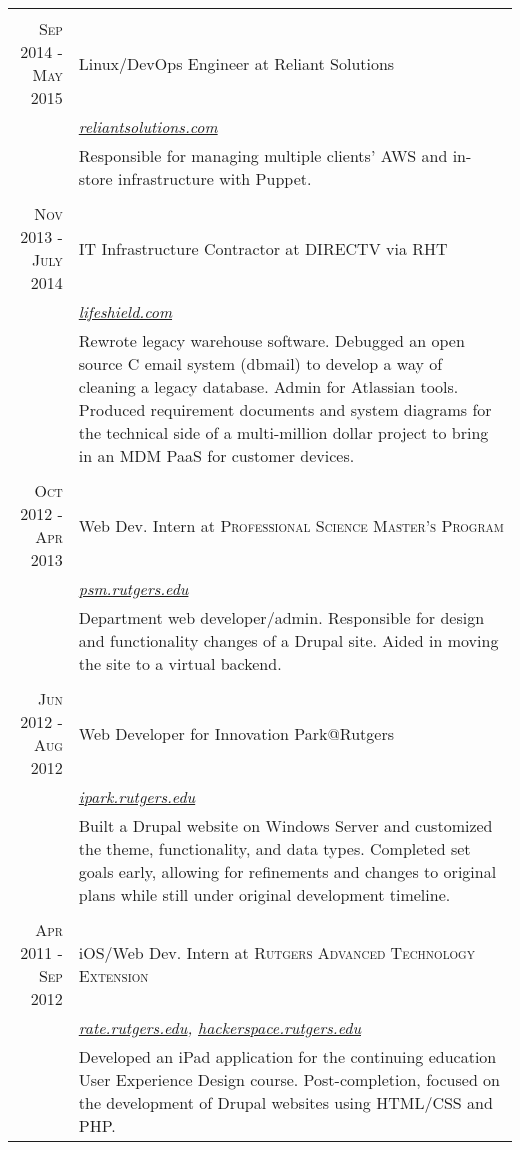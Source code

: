 \documentclass[a4paper, 10pt, onepage]{article} %
\begin{document}
\begin{tabular}{r|p{10cm}}
\multicolumn{2}{c}{}\\
\textsc{Sep 2014 - May 2015} & {Linux/DevOps Engineer at Reliant Solutions}\\
&\small\emph{\href{https://reliantsolutions.com}{reliantsolutions.com}}\\
&\footnotesize{Responsible for managing multiple clients' AWS and in-store infrastructure with Puppet.}\\

\multicolumn{2}{c}{}\\
\textsc{Nov 2013 - July 2014} & {IT Infrastructure Contractor at DIRECTV via RHT}\\
&\small\emph{\href{https://lifeshield.com}{lifeshield.com}}\\
&\footnotesize{Rewrote legacy warehouse software. Debugged an open source C email system (dbmail) to develop a way of cleaning a legacy database. Admin for Atlassian tools. Produced requirement documents and system diagrams for the technical side of a multi-million dollar project to bring in an MDM PaaS for customer devices.}\\

\multicolumn{2}{c}{}\\
\textsc{Oct 2012 - Apr 2013} & Web Dev. Intern at \textsc{Professional Science Master's Program}\\
& \small\emph{\href{https://psm.rutgers.edu}{psm.rutgers.edu}}\\
& \footnotesize{Department web developer/admin. Responsible for design and functionality changes of a Drupal site. Aided in moving the site to a virtual backend.}\\

\multicolumn{2}{c}{}\\
\textsc{Jun 2012 - Aug 2012} & Web Developer for Innovation Park@Rutgers\\
& \small\emph{\href{https://ipark.rutgers.edu}{ipark.rutgers.edu}}\\
& \footnotesize{Built a Drupal website on Windows Server and customized the theme, functionality, and data types. Completed set goals early, allowing for refinements and changes to original plans while still under original development timeline.}\\

\multicolumn{2}{c}{}\\
\textsc{Apr 2011 - Sep 2012} & iOS/Web Dev. Intern at \textsc{Rutgers Advanced Technology Extension}\\
& \small\emph{\href{https://rate.rutgers.edu}{rate.rutgers.edu}, \href{https://hackerspace.rutgers.edu}{hackerspace.rutgers.edu}}\\
& \footnotesize{Developed an iPad application for the continuing education User Experience Design course. Post-completion, focused on the development of Drupal websites using HTML/CSS and PHP.}
\end{tabular}
\end{document}
